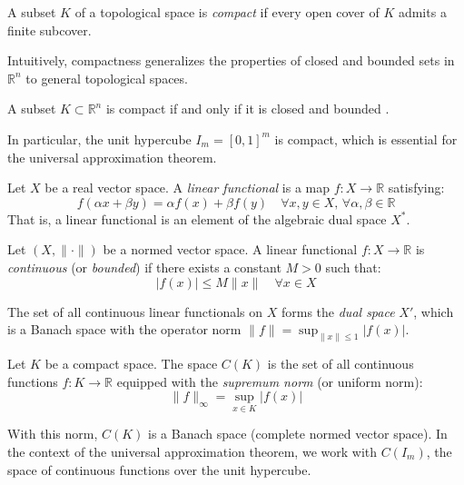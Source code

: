 \begin{definition}\label{def:espacio_compacto}
	A subset $K$ of a topological space is \textit{compact} if every open cover of $K$ admits a finite subcover.
\end{definition}

Intuitively, compactness generalizes the properties of closed and bounded sets in $\mathbb{R}^n$ to general topological spaces.

\begin{theorem}\label{thm:heine_borel}
	A subset $K \subset \mathbb{R}^n$ is compact if and only if it is closed and bounded \citep[Theorem~2.41]{Rudin1976}.
\end{theorem}

In particular, the unit hypercube $I_m = [0,1]^m$ is compact, which is essential for the universal approximation theorem.

\begin{definition}\label{def:funcional_lineal}
	Let $X$ be a real vector space. A \textit{linear functional} is a map $f: X \to \mathbb{R}$ satisfying:
	\[
		f(\alpha x + \beta y) = \alpha f(x) + \beta f(y) \quad \forall x, y \in X, \, \forall \alpha, \beta \in \mathbb{R}
	\]
	That is, a linear functional is an element of the algebraic dual space $X^*$.
\end{definition}

\begin{definition}\label{def:funcional_continuo}
	Let $(X, \|\cdot\|)$ be a normed vector space. A linear functional $f: X \to \mathbb{R}$ is \textit{continuous} (or \textit{bounded}) if there exists a constant $M > 0$ such that:
	\[
		|f(x)| \leq M\|x\| \quad \forall x \in X
	\]
\end{definition}

The set of all continuous linear functionals on $X$ forms the \textit{dual space} $X'$, which is a Banach space with the operator norm $\|f\| = \sup_{\|x\| \leq 1} |f(x)|$.

\begin{definition}\label{def:espacio_CK}
	Let $K$ be a compact space. The space $C(K)$ is the set of all continuous functions $f: K \to \mathbb{R}$ equipped with the \textit{supremum norm} (or uniform norm):
	\[
		\|f\|_\infty = \sup_{x \in K} |f(x)|
	\]
\end{definition}

With this norm, $C(K)$ is a Banach space (complete normed vector space). In the context of the universal approximation theorem, we work with $C(I_m)$, the space of continuous functions over the unit hypercube.

